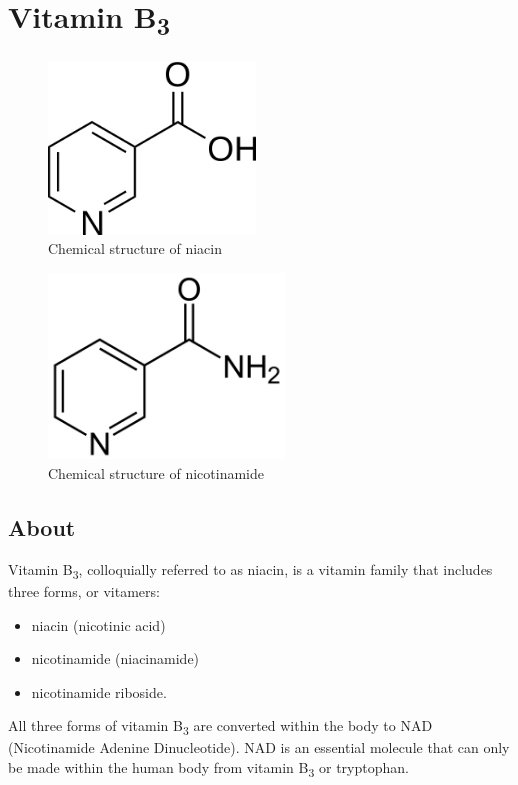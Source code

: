 \documentclass{book}
\begin{document}
\begin{sloppypar}
\chapter{Vitamin B\texorpdfstring{\textsubscript{3}}{3}}
\begin{figure}[h]
	\caption{Chemical structure of niacin}
	\centering \includegraphics[width=0.49\textwidth]{images/Vitamin_B3_chemical_structure_niacin}
\end{figure}
\begin{figure}[h]
	\caption{Chemical structure of nicotinamide}
	\centering \includegraphics[width=0.56\textwidth]{images/Vitamin_B3_chemical_structure_nicotinamide}
\end{figure}
\newpage

\section{About}
Vitamin B\textsubscript{3}, colloquially referred to as niacin, is a vitamin family that includes three forms, or vitamers:
\begin{itemize}
	\item niacin (nicotinic acid)
	\item nicotinamide (niacinamide)
	\item nicotinamide riboside.
\end{itemize}

All three forms of vitamin B\textsubscript{3} are converted within the body to NAD (Nicotinamide Adenine Dinucleotide).
NAD is an essential molecule that can only be made within the human body from vitamin B\textsubscript{3} or tryptophan.


\end{sloppypar}
\end{document}
